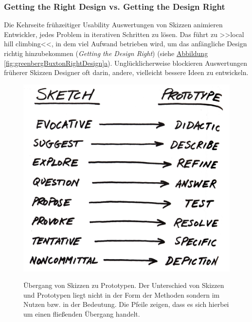 \subsubsection{Getting the Right Design vs. Getting the Design Right}  \label{sssec:rightDesign}
Die Kehrseite frühzeitiger Usability Auswertungen von Skizzen animieren Entwickler, jedes Problem in iterativen Schritten zu lösen. Das führt zu >>local hill climbing<<, in dem viel Aufwand betrieben wird, um das anfängliche Design richtig hinzubekommen (\emph{Getting the Design Right}) (siehe \hyperref[fig:greenbergBuxtonRightDesign]{Abbildung \ref{fig:greenbergBuxtonRightDesign}a}). Unglücklicherweise blockieren Auswertungen früherer Skizzen Designer oft darin, andere, vielleicht bessere Ideen zu entwickeln. \citep{Greenberg:2008}

\begin{figure}
	\begin{center}
        {\includegraphics[width=.9\linewidth]{gfx/buxtonSketch2prototype}}
	\end{center}
		\caption[Übergang von Skizzen zu Prototypen. \newline \citep{Buxton:2007}]{Übergang von Skizzen zu Prototypen. Der Unterschied von Skizzen und Prototypen liegt nicht in der Form der Methoden sondern im Nutzen bzw. in der Bedeutung. Die Pfeile zeigen, dass es sich hierbei um einen fließenden Übergang handelt.}\label{fig:buxtonSketch2prototype}
\end{figure}

